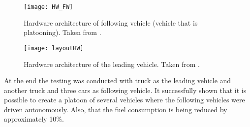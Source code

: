 % 
\begin{figure}[t]
    \centering
    \texttt{[image: HW\_FW]}
    \caption{Hardware architecture of following vehicle (vehicle that is platooning). Taken from \cite{Chan2012ProjectSARTRE}.}
    \label{fig:HW_FW}
\end{figure}
% 
\begin{figure}[t]
    \centering
    \texttt{[image: layoutHW]}
    \caption{Hardware architecture of the leading vehicle. Taken from \cite{Chan2012ProjectSARTRE}.}
    \label{fig:HW_LW}
\end{figure}
% 
At the end the testing was conducted with truck as the leading vehicle and another truck and three cars as following vehicle. It successfully shown that it is possible to create a platoon of several vehicles where the following vehicles were driven autonomously. Also, that the fuel consumption is being reduced by approximately 10\%.